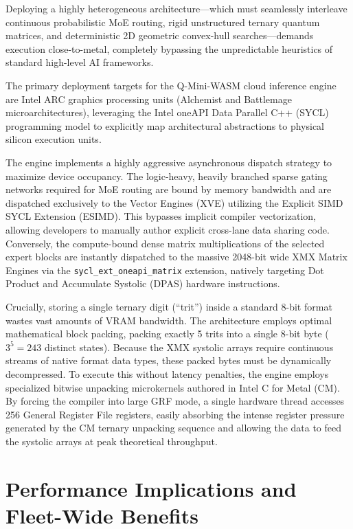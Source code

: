 \documentclass[11pt,a4paper]{article}
\begin{document}
Deploying a highly heterogeneous architecture---which must seamlessly interleave continuous probabilistic MoE routing, rigid unstructured ternary quantum matrices, and deterministic 2D geometric convex-hull searches---demands execution close-to-metal, completely bypassing the unpredictable heuristics of standard high-level AI frameworks.

The primary deployment targets for the Q-Mini-WASM cloud inference engine are Intel ARC graphics processing units (Alchemist and Battlemage microarchitectures), leveraging the Intel oneAPI Data Parallel C++ (SYCL) programming model to explicitly map architectural abstractions to physical silicon execution units.

The engine implements a highly aggressive asynchronous dispatch strategy to maximize device occupancy. The logic-heavy, heavily branched sparse gating networks required for MoE routing are bound by memory bandwidth and are dispatched exclusively to the Vector Engines (XVE) utilizing the Explicit SIMD SYCL Extension (ESIMD). This bypasses implicit compiler vectorization, allowing developers to manually author explicit cross-lane data sharing code. Conversely, the compute-bound dense matrix multiplications of the selected expert blocks are instantly dispatched to the massive 2048-bit wide XMX Matrix Engines via the \texttt{sycl\_ext\_oneapi\_matrix} extension, natively targeting Dot Product and Accumulate Systolic (DPAS) hardware instructions.

Crucially, storing a single ternary digit (``trit'') inside a standard 8-bit format wastes vast amounts of VRAM bandwidth. The architecture employs optimal mathematical block packing, packing exactly 5 trits into a single 8-bit byte ($3^5 = 243$ distinct states). Because the XMX systolic arrays require continuous streams of native format data types, these packed bytes must be dynamically decompressed. To execute this without latency penalties, the engine employs specialized bitwise unpacking microkernels authored in Intel C for Metal (CM). By forcing the compiler into large GRF mode, a single hardware thread accesses 256 General Register File registers, easily absorbing the intense register pressure generated by the CM ternary unpacking sequence and allowing the data to feed the systolic arrays at peak theoretical throughput.

\section{Performance Implications and Fleet-Wide Benefits}
\end{document}
